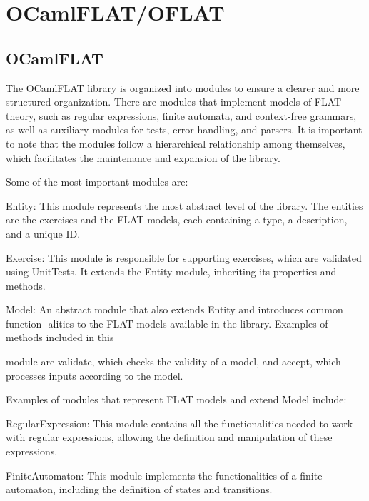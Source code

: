 
%

\chapter{OCamlFLAT/OFLAT}
\label{cha:ocaml_flat_and_oflat_systems}

\section{OCamlFLAT}

The OCamlFLAT library is organized into modules to ensure a clearer and more structured
organization. There are modules that implement models of FLAT theory, such as regular
expressions, finite automata, and context-free grammars, as well as auxiliary modules
for tests, error handling, and parsers. It is important to note that the modules follow
a hierarchical relationship among themselves, which facilitates the maintenance and
expansion of the library.

Some of the most important modules are:

Entity: This module represents the most abstract level of the library. The entities are
the exercises and the FLAT models, each containing a type, a description, and a unique
ID.

Exercise: This module is responsible for supporting exercises, which are validated
using UnitTests. It extends the Entity module, inheriting its properties and methods.

Model: An abstract module that also extends Entity and introduces common function-
alities to the FLAT models available in the library. Examples of methods included in this

module are validate, which checks the validity of a model, and accept, which processes
inputs according to the model.

Examples of modules that represent FLAT models and extend Model include:

RegularExpression: This module contains all the functionalities needed to work with
regular expressions, allowing the definition and manipulation of these expressions.

FiniteAutomaton: This module implements the functionalities of a finite automaton,
including the definition of states and transitions.

